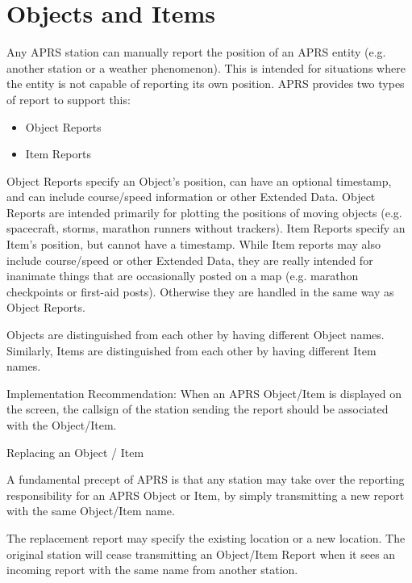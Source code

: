 
\section{Objects and Items}

Any APRS station can manually report the position of an APRS entity (e.g.
another station or a weather phenomenon). This is intended for situations
where the entity is not capable of reporting its own position.
APRS provides two types of report to support this:

\begin{itemize}

 \item Object Reports

 \item Item Reports

\end{itemize}


Object Reports specify an Object’s position, can have an optional timestamp,
and can include course/speed information or other Extended Data. Object
Reports are intended primarily for plotting the positions of moving objects
(e.g. spacecraft, storms, marathon runners without trackers).
Item Reports specify an Item’s position, but cannot have a timestamp. While
Item reports may also include course/speed or other Extended Data, they are
really intended for inanimate things that are occasionally posted on a map
(e.g. marathon checkpoints or first-aid posts). Otherwise they are handled in
the same way as Object Reports.

Objects are distinguished from each other by having different Object names.
Similarly, Items are distinguished from each other by having different Item
names.

Implementation Recommendation: When an APRS Object/Item is displayed
on the screen, the callsign of the station sending the report should be
associated with the Object/Item.

Replacing an
Object / Item

A fundamental precept of APRS is that any station may take over the
reporting responsibility for an APRS Object or Item, by simply transmitting a
new report with the same Object/Item name.

The replacement report may specify the existing location or a new location.
The original station will cease transmitting an Object/Item Report when it
sees an incoming report with the same name from another station.

